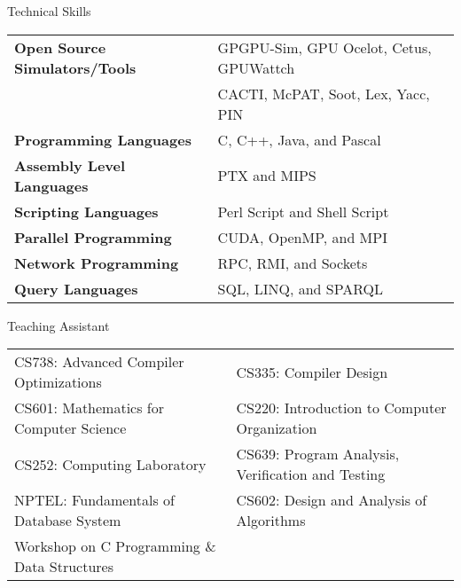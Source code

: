 \documentclass{resume} %
\begin{document}

\begin{rSection}{Technical Skills}

\begin{tabular}{ @{} >{\bfseries}l @{\hspace{6ex}} l }
Open Source Simulators/Tools & GPGPU-Sim, GPU Ocelot, Cetus, GPUWattch \\
& CACTI, McPAT, Soot, Lex, Yacc, PIN \\
Programming Languages & C, C++, Java, and Pascal \\
Assembly Level Languages & PTX and MIPS\\
Scripting Languages &  Perl Script and Shell Script\\
Parallel Programming & CUDA, OpenMP, and MPI \\
Network	Programming & RPC, RMI, and  Sockets \\
Query Languages & SQL, LINQ, and SPARQL\\
\end{tabular}

\end{rSection}

\begin{rSection}{Teaching Assistant}
\begin{tabular}{ll}
CS738: Advanced Compiler Optimizations & CS335: Compiler Design \\ 
CS601: Mathematics for Computer Science & CS220: Introduction to Computer Organization \\  
CS252: Computing Laboratory & CS639: Program Analysis, Verification and Testing\\
NPTEL: Fundamentals of Database System &   CS602: Design and Analysis of Algorithms  \\
Workshop on C Programming \& Data Structures 
\end{tabular}

\end{rSection}


\end{document}
